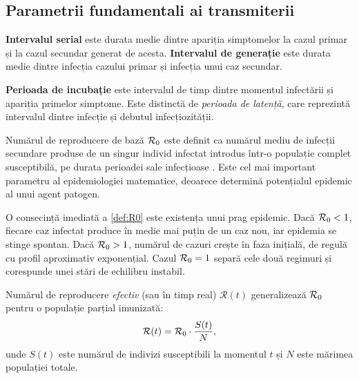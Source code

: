 \subsection{Parametrii fundamentali ai transmiterii}
\label{subsec:parametri}

\begin{definitie}
\textbf{Intervalul serial} este durata medie dintre apariția simptomelor la cazul
primar și la cazul secundar generat de acesta. \textbf{Intervalul de generație}
este durata medie dintre infecția cazului primar și infecția unui caz secundar.
\end{definitie}

\begin{definitie}
\textbf{Perioada de incubație} este intervalul de timp dintre momentul infectării
și apariția primelor simptome. Este distinctă de \emph{perioada de latență},
care reprezintă intervalul dintre infecție și debutul infecțiozității.
\end{definitie}

\begin{definitie}
\label{def:R0}
Numărul de reproducere de bază $\mathcal{R}_0$ este definit ca numărul mediu de infecții
secundare produse de un singur individ infectat introdus într-o populație
complet susceptibilă, pe durata perioadei sale infecțioase \cite{diekmann1990}.
Este cel mai important parametru al epidemiologiei matematice, deoarece determină
potențialul epidemic al unui agent patogen.
\end{definitie}

O consecință imediată a \cref{def:R0} este existența unui prag epidemic. Dacă
$\mathcal{R}_0 < 1$, fiecare caz infectat produce în medie mai puțin de un caz nou, iar
epidemia se stinge spontan. Dacă $\mathcal{R}_0 > 1$, numărul de cazuri crește în faza
inițială, de regulă cu profil aproximativ exponențial. Cazul $\mathcal{R}_0 = 1$ separă
cele două regimuri și corespunde unei stări de echilibru instabil.

Numărul de reproducere \emph{efectiv} (sau în timp real) $\mathcal{R}(t)$ generalizează
$\mathcal{R}_0$ pentru o populație parțial imunizată:
\begin{equation}
    \mathcal{R}(t) = \mathcal{R}_0 \cdot \frac{S(t)}{N},
\end{equation}
unde $S(t)$ este numărul de indivizi susceptibili la momentul $t$ și $N$ este
mărimea populației totale.

